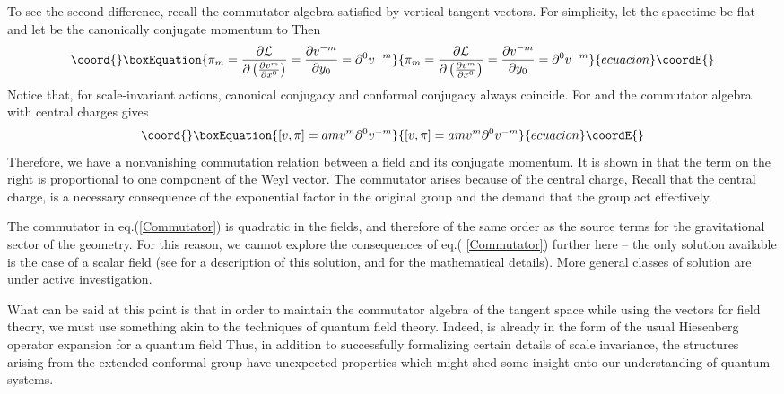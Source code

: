 \documentclass[a4paper,12pt]{article}
\begin{document}
To see the second difference, recall the commutator algebra satisfied by
vertical tangent vectors. For simplicity, let the spacetime be flat and let \coordHE{} be the canonically conjugate momentum to \coordHE{} Then 
\begin{equation}\coord{}\boxEquation{
\pi _{m}=\frac{\partial \mathcal{L}}{\partial \left( \frac{\partial v^{m}}{
\partial x^{0}}\right) }=\frac{\partial v^{-m}}{\partial y_{0}}=\partial
^{0}v^{-m}
}{
\pi _{m}=\frac{\partial \mathcal{L}}{\partial \left( \frac{\partial v^{m}}{
\partial x^{0}}\right) }=\frac{\partial v^{-m}}{\partial y_{0}}=\partial
^{0}v^{-m}
}{ecuacion}\coordE{}\end{equation}
Notice that, for scale-invariant actions, canonical conjugacy and conformal
conjugacy always coincide. For \coordHE{} and \coordHE{} the commutator
algebra with central charges gives 
\begin{equation}\coord{}\boxEquation{
\lbrack v,\pi ]=amv^{m}\partial ^{0}v^{-m}  \label{Commutator}
}{
\lbrack v,\pi ]=amv^{m}\partial ^{0}v^{-m}  }{ecuacion}\coordE{}\end{equation}
Therefore, we have a nonvanishing commutation relation between a field and
its conjugate momentum. It is shown in \cite{WWII} that the term on the
right is proportional to one component of the Weyl vector. The commutator
arises because of the central charge, \coordHE{} Recall that the central charge, \coordHE{} is a necessary consequence of the exponential factor in the original
group and the demand that the group act effectively.

The commutator in eq.(\ref{Commutator}) is quadratic in the fields, and
therefore of the same order as the source terms for the gravitational sector
of the geometry. For this reason, we cannot explore the consequences of eq.(%
\ref{Commutator}) further here -- the only solution available is the \coordHE{}
case of a scalar field (see \cite{WWIII} for a description of this solution,
and \cite{WWII} for the mathematical details). More general classes of
solution are under active investigation.

What can be said at this point is that in order to maintain the commutator
algebra of the tangent space while using the vectors for field theory, we
must use something akin to the techniques of quantum field theory. Indeed, \coordHE{} is already in the form of the usual Hiesenberg operator expansion for a
quantum field\coordHE{} Thus, in addition to successfully formalizing certain
details of scale invariance, the structures arising from the extended
conformal group have unexpected properties which might shed some insight
onto our understanding of quantum systems.
\end{document}
